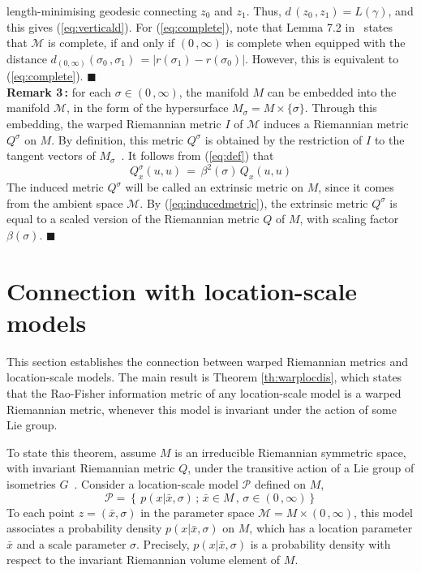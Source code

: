 \documentclass{svmult}
\begin{document}
length-minimising geodesic connecting $z_{\scriptscriptstyle 0}$ and $z_{\scriptscriptstyle 1}$. Thus, $d\,\!(z_{\scriptscriptstyle 0}\,\!,z_{\scriptscriptstyle 1}) = L(\gamma)$, and this gives (\ref{eq:verticald}). For (\ref{eq:complete}), note that Lemma 7.2 in~\cite{bishop} states that $\mathcal{M}$ is complete, if and only if $(0\,,\infty)$ is complete when equipped with the distance $d_{(0,\infty)}(\sigma_{\scriptscriptstyle 0}\,,\sigma_{\scriptscriptstyle 1}) \,= \left| r(\sigma_{\scriptscriptstyle 1}) - r(\sigma_{\scriptscriptstyle 0})\right|$. However, this is equivalent to (\ref{eq:complete}). \hfill$\blacksquare$ \\[0.1cm] 
\textbf{Remark 3\,:} for each $\sigma \in (0\,,\infty)$, the manifold $M$ can be embedded into the manifold $\mathcal{M}$, in the form of the hypersurface $M_\sigma = M \times \lbrace \sigma \rbrace$. Through this embedding, the warped Riemannian metric $I$ of $\mathcal{M}$ induces a Riemannian metric $Q^\sigma$ on $M$. By definition, this metric $Q^\sigma$ is obtained by the restriction of $I$ to the tangent vectors of $M_\sigma$\!~\cite{petersen,docarmo}. It follows from (\ref{eq:def}) that
\begin{equation} \label{eq:inducedmetric}
  Q^\sigma_x(u,u) \,=\, \beta^2(\sigma)\,Q_x(u,u)  
\end{equation}
The induced metric $Q^\sigma$ will be called an extrinsic metric on $M$, since it comes from the ambient space $\mathcal{M}$. By (\ref{eq:inducedmetric}),
the extrinsic metric $Q^\sigma$ is equal to a scaled version of the Riemannian metric $Q$ of $M$, with scaling factor $\beta(\sigma)$. \hfill$\blacksquare$
\section{Connection with location-scale models} \label{sec:theorem}
 This section establishes the connection between warped Riemannian metrics and location-scale models. The main result is Theorem \ref{th:warplocdis}, which states that the Rao-Fisher information metric of any location-scale model is a warped Riemannian metric, whenever this model is invariant under the action of some Lie group.

To state this theorem, assume $M$ is an irreducible Riemannian symmetric space, with invariant Riemannian metric $Q$, under the transitive action of a Lie group of isometries $G$~\cite{helgason}. Consider a location-scale model $\mathcal{P}$ defined on $M$,
\begin{equation} \label{eq:locationscale}
  \mathcal{P} = \left\lbrace\,p(x|\bar{x},\sigma)\,;\,\bar{x} \in M \,,\, \sigma \in (0\,,\infty)\right\rbrace
\end{equation}
To each point $z = (\bar{x},\sigma)$ in the parameter space $\mathcal{M} = M \times (0\,,\infty)$, this model associates a probability density $p(x|\bar{x},\sigma)$ on $M$, which has a location parameter $\bar{x}$ and a scale parameter $\sigma$. Precisely, $p(x|\bar{x},\sigma)$ is a probability density with respect to the invariant Riemannian volume element of $M$. 
\end{document}
